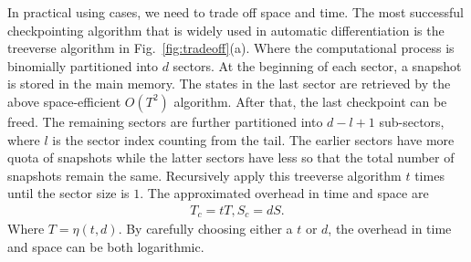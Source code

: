 \documentclass{article}
\newcommand{\<}{\langle}
\renewcommand{\>}{\rangle}
\newcommand{\Fig}[1]{Fig.~\ref{#1}}
\theoremstyle{definition}\newtheorem{definition}{\textit{Definition}}
\begin{document}
In practical using cases, we need to trade off space and time. The most successful checkpointing algorithm that is widely used in automatic differentiation is the treeverse algorithm in \Fig{fig:tradeoff}(a). Where the computational process is binomially partitioned into $d$ sectors. At the beginning of each sector, a snapshot is stored in the main memory. The states in the last sector are retrieved by the above space-efficient $O(T^2)$ algorithm. After that, the last checkpoint can be freed. The remaining sectors are further partitioned into $d-l+1$ sub-sectors, where $l$ is the sector index counting from the tail. The earlier sectors have more quota of snapshots while the latter sectors have less so that the total number of snapshots remain the same.
Recursively apply this treeverse algorithm $t$ times until the sector size is $1$. The approximated overhead in time and space are
\begin{align}
    T_c = tT, S_c = dS.
\end{align}
Where $T = \eta(t, d)$. By carefully choosing either a $t$ or $d$, the overhead in time and space can be both logarithmic.
\end{document}
